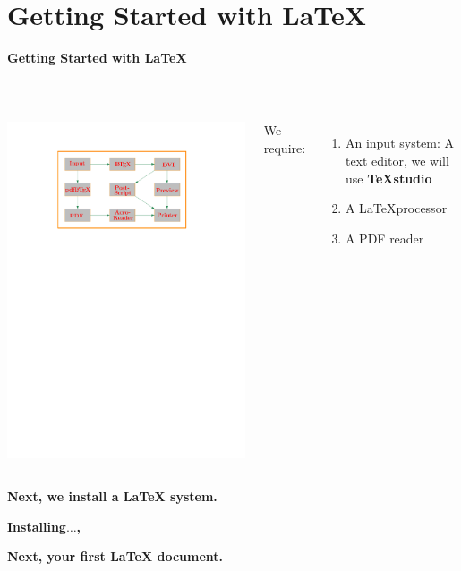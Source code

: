 \documentclass[xcolor=dvipsnames]{beamer}
\begin{document}
\section{Getting Started with \LaTeX{}}
\begin{frame}{\textbf{Getting Started with \LaTeX{}}}

\\
\vspace{0.5cm}
\begin{columns}
\vfill
\includegraphics[scale =0.5]{fig/fig10}\centering
{}

We require:\\

\begin{enumerate}

\item An input system: A text editor, we will use \textbf{TeXstudio }
\item A \LaTeX processor
\item A PDF reader

\end{enumerate}


\end{columns}
\vspace{0.8cm}
\textbf{Next, we install a \LaTeX{} system.}

\end{frame}
{
\begin{frame}{\Huge \textbf{Installing$\ldots$,}}
\pagestyle{plain}
\Huge

\textbf{Next, your first \LaTeX{} document.}


\end{frame}

}
\end{document}
